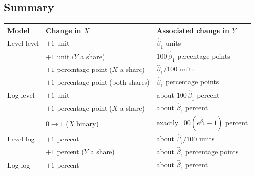 \documentclass[11pt]{article}
\begin{document}
\subsection{Summary}

\begin{center}
\begin{tabular}{lll}
\toprule
Model & Change in $X$ & Associated change in $Y$ \\
\midrule
Level-level & $+1$ unit & $\hat\beta_1$ units \\
 & $+1$ unit ($Y$ a share) & $100\,\hat\beta_1$ percentage points \\
 & $+1$ percentage point ($X$ a share) & $\hat\beta_1/100$ units \\
 & $+1$ percentage point (both shares) & $\hat\beta_1$ percentage points \\
\addlinespace
Log-level & $+1$ unit & about $100\,\hat\beta_1$ percent \\
 & $+1$ percentage point ($X$ a share) & about $\hat\beta_1$ percent \\
 & $0 \to 1$ ($X$ binary) & exactly $100(e^{\hat\beta_1}-1)$ percent \\
\addlinespace
Level-log & $+1$ percent & about $\hat\beta_1/100$ units \\
 & $+1$ percent ($Y$ a share) & about $\hat\beta_1$ percentage points \\
\addlinespace
Log-log & $+1$ percent & about $\hat\beta_1$ percent \\
\bottomrule
\end{tabular}
\end{center}
\end{document}
